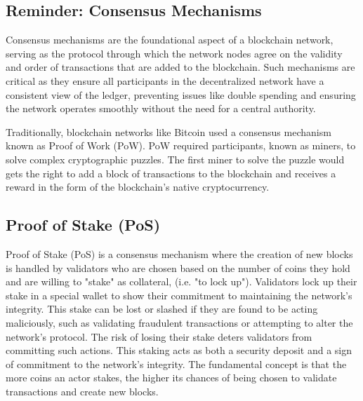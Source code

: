 \subsection{Reminder: Consensus Mechanisms}

Consensus mechanisms are the foundational aspect of a blockchain network, serving as the protocol through which the network nodes agree on the validity and order of transactions that are added to the blockchain. Such mechanisms are critical as they ensure all participants in the decentralized network have a consistent view of the ledger, preventing issues like double spending and ensuring the network operates smoothly without the need for a central authority.

Traditionally, blockchain networks like Bitcoin used a consensus mechanism known as Proof of Work (PoW). PoW required participants, known as miners, to solve complex cryptographic puzzles. The first miner to solve the puzzle would gets the right to add a block of transactions to the blockchain and receives a reward in the form of the blockchain's native cryptocurrency. 

\subsection{Proof of Stake (PoS)}
Proof of Stake (PoS) \cite{kiayias2017ouroboros} is a consensus mechanism where the creation of new blocks is handled by validators who are chosen based on the number of coins they hold and are willing to "stake" as collateral, (i.e. "to lock up"). Validators lock up their stake in a special wallet to show their commitment to maintaining the network's integrity. This stake can be lost or slashed if they are found to be acting maliciously, such as validating fraudulent transactions or attempting to alter the network's protocol. The risk of losing their stake deters validators from committing such actions. This staking acts as both a security deposit and a sign of commitment to the network's integrity. The fundamental concept is that the more coins an actor stakes, the higher its chances of being chosen to validate transactions and create new blocks.

